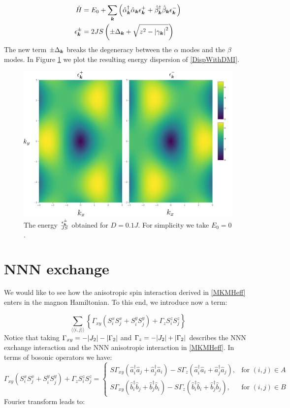 \begin{align}
\hat{H} &= E_0 + \sum_{\boldsymbol{k}} \left( \hat{\alpha}_{\boldsymbol{k}}^\dagger \hat{\alpha}_{\boldsymbol{k}} \epsilon_{\boldsymbol{k}}^+ +\hat{\beta}_{\boldsymbol{k}}^\dagger \hat{\beta}_{\boldsymbol{k}}  \epsilon_{\boldsymbol{k}}^- \right) \label{DispWithDMI} \\
\epsilon_{\boldsymbol{k}}^\pm &= 2JS \left( \pm \Delta_{\boldsymbol{k}} + \sqrt{z^2-\abs{\gamma_{\boldsymbol{k}}}^2} \right)
\end{align}
The new term $\pm \Delta_{\boldsymbol{k}}$ breaks the degeneracy between the $\alpha$ modes and the $\beta$ modes. In Figure \ref{Fig.Magnon.Disp} we plot the resulting energy dispersion of \ref{DispWithDMI}.

\begin{figure}
\centering
  \includegraphics[width=0.7\linewidth]{../Figures/magnon_disp_2.png}
  \caption{The energy $\frac{\epsilon_{\boldsymbol{k}}^\pm}{JS}$ obtained for $D=0.1J$. For simplicity we take $E_0 = 0$. }
\label{Fig.Magnon.Disp}
\end{figure}

\section{NNN exchange}

We would like to see how the anisotropic spin interaction derived in \ref{MKMHeff} enters in the magnon Hamiltonian. To this end, we introduce now a term:

\begin{equation}
\sum_{\langle \langle i,j \rangle \rangle} \left\{ \Gamma_{xy}(S_i^xS_j^x + S_i^yS_j^y) + \Gamma_zS_i^zS_j^z\right\}
\end{equation}
Notice that taking $\Gamma_{xy} = -\abs{J_2}-\abs{\Gamma_2}$ and $\Gamma_z = -\abs{J_2}+\abs{\Gamma_2}$ describes the NNN exchange interaction and the NNN anisotropic interaction in \ref{MKMHeff}. In terms of bosonic operators we have:
\begin{equation}
\Gamma_{xy}(S_i^xS_j^x + S_i^yS_j^y) + \Gamma_zS_i^zS_j^z = \begin{cases}
             S\Gamma_{xy}(\hat{a}_i^\dagger\hat{a}_j+\hat{a}_j^\dagger\hat{a}_i) - S\Gamma_z(\hat{a}_i^\dagger\hat{a}_i+\hat{a}_j^\dagger\hat{a}_j),  & \text{for } (i,j) \in A \\
             S\Gamma_{xy}(\hat{b}_i^\dagger\hat{b}_j+\hat{b}_j^\dagger\hat{b}_i) - S\Gamma_z(\hat{b}_i^\dagger\hat{b}_i+\hat{b}_j^\dagger\hat{b}_j),  & \text{for } (i,j) \in B
       \end{cases} \quad
\end{equation}
Fourier transform leads to:


